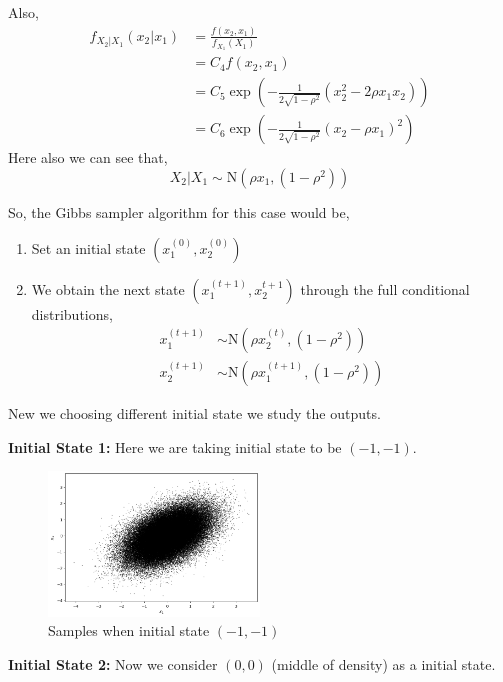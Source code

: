 \begin{example}
    Also, 
    \begin{align*}
        f_{X_2|X_1} (x_2|x_1) &= \frac{f(x_2,x_1)}{f_{X_1}(X_1)} \\ 
                    &=C_4 f(x_2,x_1) \\
                    &=C_5 \exp \left( - \frac{1}{2 \sqrt{1-\rho^2}} (x_2^2 - 2 \rho x_1x_2) \right) \\
                    &= C_6 \exp \left(- \frac{1}{2 \sqrt{1-\rho^2}} (x_2 - \rho x_1)^2   \right)
    \end{align*}
    Here also we can see that,
    \[
        X_2|X_1 \sim \text{N}\left(\rho x_1, (1-\rho^2)\right)
    \]

    So, the Gibbs sampler algorithm for this case would be,
    \begin{enumerate}
        \item Set an initial state $ \left(x_1^{(0)} , x_2^{(0)} \right) $
        \item We obtain the next state $ \left( x_1^{(t+1)} , x_2^{t+1} \right) $ through the full conditional distributions, 
            \begin{align*}
                x_1^{(t+1)} &\sim \text{N}\left(\rho x_2^{(t)}, (1-\rho^2) \right) \\
                x_2 ^{(t+1)} &\sim \text{N}\left(\rho x_1^{(t+1)}, (1-\rho^2) \right) 
            \end{align*}
    \end{enumerate}
    New we choosing different initial state we study the outputs.

    \textbf{Initial State 1:} Here we are taking initial state to be $(-1,-1)$. 
    \begin{figure}[H]
        \centering
        \includegraphics[width=0.5\textwidth]{images/gibbs/ex1-init1.png}
        \caption{Samples when initial state $(-1,-1)$}
    \end{figure}

    \textbf{Initial State 2:} Now we consider $(0,0)$ (middle of density) as a initial state. 


\end{example}
